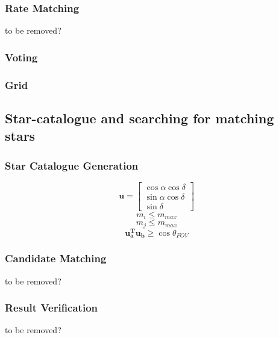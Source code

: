 \documentclass[12pt,a4paper,oneside]{article}
\begin{document}
\citet{mortari2004pyramid}\par


\subsubsection{Rate Matching}
\citet{samaan2005recursive}
to be removed?
\subsubsection{Voting}
\citet{kolomenkin2008geometric} \par
\subsubsection{Grid}
\citet{padgett1997grid}
\subsection{Star-catalogue and searching for matching stars}

\subsubsection{Star Catalogue Generation}
\citet{6187242}
\begin{equation}
\bm{u} = \begin{bmatrix}
\cos \alpha \cos \delta \\
\sin \alpha \cos \delta \\
\sin \delta
\end{bmatrix}
\end{equation}
\begin{equation}
m_i \leq m_{max}
\end{equation}
\begin{equation}
m_j \leq m_{max}
\end{equation}
\begin{equation}
\bm{u_a^T u_b} \geq \cos \theta_{FOV}
\end{equation}

\subsubsection{Candidate Matching}
to be removed?
\subsubsection{Result Verification}
to be removed?
\end{document}
